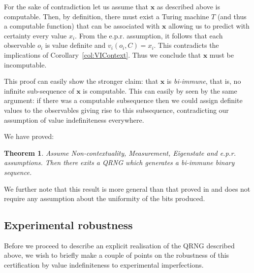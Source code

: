 \documentclass[%
 preprint,
 showpacs,
 showkeys,
 amsmath,
 amssymb,
 aps,
 pra,
 ]{revtex4-1}
\newtheorem{Theorem}{Theorem}
\theoremstyle{definition}
\newcommand{\seq}[1]{\mathbf{#1}}
\begin{document}
For the sake of contradiction let us assume that $\seq{x}$ as described above is computable.
Then, by definition, there must exist a Turing machine $T$ (and thus a computable function) that can be associated with $\seq{x}$ allowing us to predict with certainty every value $x_i$.
From the e.p.r. assumption, it follows that each observable $o_i$ is value definite and $v_i(o_i,C)=x_i$.
This contradicts the implications of Corollary~\ref{col:VIContext}.
Thus we conclude that $\seq{x}$ must be incomputable.

This proof can easily show the stronger claim: that $\seq{x}$ is {\em bi-immune}, that is, no infinite sub-sequence of $\seq{x}$ is computable.
This can easily by seen by the same argument: if there was a computable subsequence then we could assign definite values to the observables giving rise to this subsequence, contradicting our assumption of value indefiniteness everywhere.



We have proved:\\

\begin{Theorem} Assume Non-contextuality, Measurement, Eigenstate and e.p.r. assumptions.  Then there exits a QRNG which generates a bi-immune binary sequence.
\end{Theorem}

We further note that this result is more general than that proved in
\cite{svozil-2006-ran}
and does not require any assumption about the uniformity of the bits produced.

\subsection{Experimental robustness}
\label{2012-incomput-proofsCJ-er}

Before we proceed to describe an explicit realisation of the QRNG described above, we wish to briefly make a couple of points on the robustness of this certification by value indefiniteness to experimental imperfections.
\end{document}
